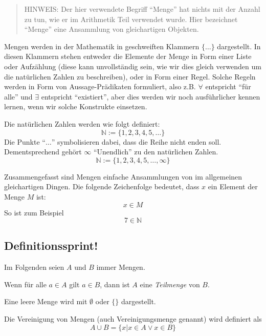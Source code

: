 \begin{quote}
HINWEIS: Der hier verwendete Begriff "`Menge"' hat nichts mit der Anzahl zu tun, wie er im Arithmetik Teil verwendet wurde. Hier bezeichnet "`Menge"' eine Ansammlung von gleichartigen Objekten.
\end{quote}

Mengen werden in der Mathematik in geschweiften Klammern $\{\dots \}$ dargestellt. In diesen Klammern stehen entweder die Elemente der Menge in Form einer Liste oder Aufzählung (diese kann unvollständig sein, wie wir dies gleich verwenden um die natürlichen Zahlen zu beschreiben), oder in Form einer Regel. Solche Regeln werden in Form von Aussage-Prädikaten formuliert, also z.B. $\forall$ entspricht "`für alle"' und $\exists$ entspricht "`existiert"', aber dies werden wir noch ausführlicher kennen lernen, wenn wir solche Konstrukte einsetzen. 

Die natürlichen Zahlen werden wie folgt definiert:
\[\mathbb{N} := \{ 1,2,3,4,5, \dots \} \]
Die Punkte "`$\dots$"' symbolisieren dabei, dass die Reihe nicht enden soll. Dementsprechend gehört $\infty$ "`Unendlich"' zu den natürlichen Zahlen.
\[\mathbb{N} := \{ 1,2,3,4,5, \dots, \infty \} \]

Zusammengefasst sind Mengen einfache Ansammlungen von im allgemeinen gleichartigen Dingen. Die folgende Zeichenfolge bedeutet, dass $x$ ein Element der Menge $M$ ist:
\[x \in M \]
So ist zum Beispiel
\[7 \in \mathbb{N} \]

\subsection{Definitionssprint!}
Im Folgenden seien $A$ und $B$ immer Mengen.

\begin{definition}
Wenn für alle $a\in A$ gilt $a\in B$, dann ist $A$ eine \textsl{Teilmenge} von $B$.
\end{definition}

\begin{definition}
Eine leere Menge wird mit $\emptyset$ oder $\{\}$ dargestellt.
\end{definition}

\begin{definition}
Die Vereinigung von Mengen (auch Vereinigungsmenge genannt) wird definiert als
\[A \cup B = \{ x | x\in A \vee x\in B \}\]
\end{definition}

